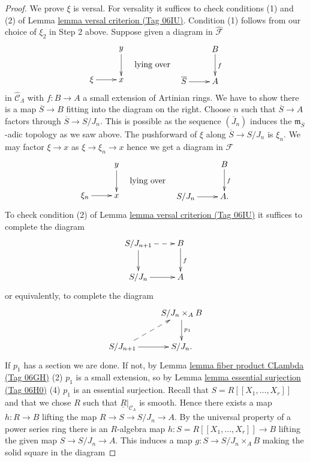 \documentclass{amsart}
\theoremstyle{plain}
\theoremstyle{definition}
\theoremstyle{remark}
\numberwithin{equation}{subsection}
\begin{document}
\begin{proof}
\medskip\noindent
We prove $\xi$ is versal. For versality it suffices to check
conditions (1) and (2) of
Lemma \href{https://stacks.math.columbia.edu/tag/06IU}{lemma versal criterion (Tag 06IU)}.
Condition (1) follows from our choice of $\xi_2$ in Step 2 above.
Suppose given a diagram in $\widehat{\mathcal{F}}$
$$
\vcenter{
\xymatrix{
            &  y \ar[d] \\
\xi \ar[r]  &  x
}
}
\quad\text{lying over}\quad
\vcenter{
\xymatrix{
         &   B  \ar[d]^{f} \\
\overline{S} \ar[r] &   A
}
}
$$
in $\widehat{\mathcal{C}}_\Lambda$ with $f: B \to A$ a small extension
of Artinian rings. We have to show there is a map $\overline{S} \to B$ fitting
into the diagram on the right. Choose $n$ such that
$\overline{S} \to A$ factors through $\overline{S} \to S/J_n$. This is
possible as the sequence $(\overline{J}_n)$ induces the
$\mathfrak m_{\overline{S}}$-adic topology as we saw above.
The pushforward of $\xi$ along $\overline{S} \to S/J_n$ is $\xi_n$.
We may factor $\xi \to x$ as $\xi \to \xi_n \to x$ hence we get a diagram
in $\mathcal{F}$
$$
\vcenter{
\xymatrix{
            &  y \ar[d] \\
\xi_n \ar[r]  &  x
}
}
\quad\text{lying over}\quad
\vcenter{
\xymatrix{
         &   B  \ar[d]^{f} \\
S/J_n \ar[r] &   A .
}
}
$$
To check condition (2) of
Lemma \href{https://stacks.math.columbia.edu/tag/06IU}{lemma versal criterion (Tag 06IU)}
it suffices to complete the diagram
$$
\xymatrix{
S/J_{n + 1} \ar[d] \ar@{-->}[r] & B \ar[d]^{f} \\
S/J_n   \ar[r] & A
}
$$
or equivalently, to complete the diagram
$$
\xymatrix{
  &  S/J_n \times_A B \ar[d]^{p_1} \\
S/J_{n + 1} \ar@{-->}[ur] \ar[r] &  S/J_n.
}
$$
If $p_1$ has a section we are done. If not, by
Lemma \href{https://stacks.math.columbia.edu/tag/06GH}{lemma fiber product CLambda (Tag 06GH)} (2)
$p_1$ is a small extension, so by
Lemma \href{https://stacks.math.columbia.edu/tag/06H0}{lemma essential surjection (Tag 06H0)} (4)
$p_1$ is an essential surjection. Recall that $S = R[[X_1, \ldots, X_r]]$
and that we chose $R$ such that $\underline{R}|_{\mathcal{C}_\Lambda}$
is smooth. Hence there exists a map $h : R \to B$ lifting the map
$R \to S \to S/J_n \to A$. By the universal property of a power series
ring there is an $R$-algebra map $h : S = R[[X_1, \ldots, X_r]] \to B$
lifting the given map $S \to S/J_n \to A$. This induces a map
$g: S \to S/J_n \times_A B$ making the solid square in the diagram

\end{proof}
\end{document}
